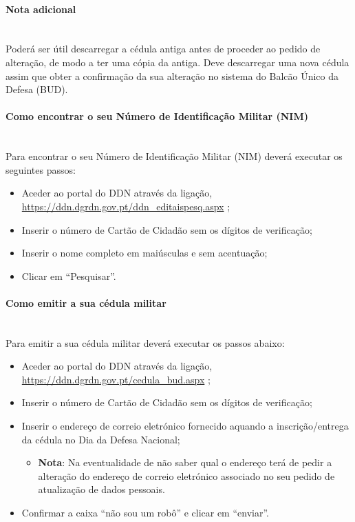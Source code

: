 \paragraph{Nota adicional}
\leavevmode\\[4pt]
Poderá ser útil descarregar a cédula antiga antes de proceder ao pedido
de alteração, de modo a ter uma cópia da antiga. Deve descarregar uma
nova cédula assim que obter a confirmação da sua alteração no sistema do
Balcão Único da Defesa (BUD). \\

\paragraph{Como encontrar o seu Número de Identificação Militar (NIM)}
\leavevmode\\[4pt]
Para encontrar o seu Número de Identificação Militar (NIM) deverá
executar os seguintes passos:
\begin{itemize}
	\item Aceder ao portal do DDN através da ligação, \url{https://ddn.dgrdn.gov.pt/ddn\_editaispesq.aspx} ;
	\item Inserir o número de Cartão de Cidadão sem os dígitos de verificação;
	\item Inserir o nome completo em maiúsculas e sem acentuação;
	\item Clicar em ``Pesquisar''.
\end{itemize}

\paragraph{Como emitir a sua cédula militar}
\leavevmode\\[4pt]
Para emitir a sua cédula militar deverá executar os passos abaixo:
\begin{itemize}
	\item Aceder ao portal do DDN através da ligação, \url{https://ddn.dgrdn.gov.pt/cedula\_bud.aspx} ;
	\item Inserir o número de Cartão de Cidadão sem os dígitos de verificação;
	\item Inserir o endereço de correio eletrónico fornecido aquando a inscrição/entrega da cédula no Dia da Defesa Nacional;
	\begin{itemize}
		\item \textbf{Nota}: Na eventualidade de não saber qual o endereço terá de pedir a alteração do endereço de correio eletrónico associado no seu pedido de atualização de dados pessoais.
	\end{itemize}
	\item Confirmar a caixa ``não sou um robô'' e clicar em ``enviar''.
\end{itemize}

